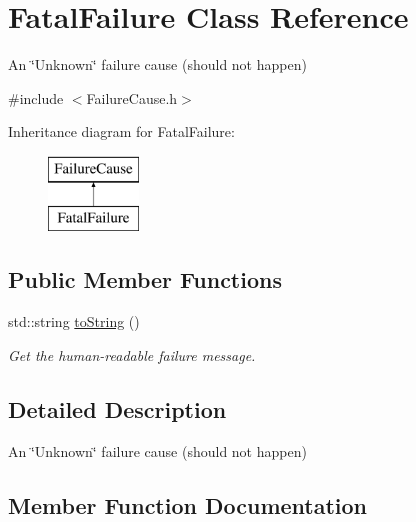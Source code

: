 \hypertarget{class_fatal_failure}{}\section{Fatal\+Failure Class Reference}
\label{class_fatal_failure}


An \char`\"{}\+Unknown\char`\"{} failure cause (should not happen)  




{\ttfamily \#include $<$Failure\+Cause.\+h$>$}

Inheritance diagram for Fatal\+Failure\+:\begin{figure}[H]
\begin{center}
\leavevmode
\includegraphics[height=2.000000cm]{class_fatal_failure}
\end{center}
\end{figure}
\subsection*{Public Member Functions}
\begin{DoxyCompactItemize}
\item 
std\+::string \hyperlink{class_fatal_failure_ae0d970966292c1ec761f1ef0e13f97df}{to\+String} ()
\begin{DoxyCompactList}\small\item\em Get the human-\/readable failure message. \end{DoxyCompactList}\end{DoxyCompactItemize}


\subsection{Detailed Description}
An \char`\"{}\+Unknown\char`\"{} failure cause (should not happen) 

\subsection{Member Function Documentation}
\mbox{\label{class_fatal_failure_ae0d970966292c1ec761f1ef0e13f97df}} 
